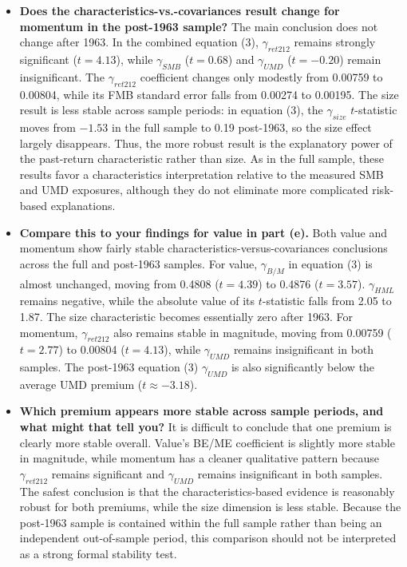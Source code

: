 \documentclass[11pt]{article}
\newenvironment{tight}
  {\begin{itemize}\setlength{\itemsep}{3pt}\setlength{\parskip}{0pt}%
   \setlength{\topsep}{3pt}\setlength{\leftmargini}{1.4em}}
  {\end{itemize}}
\begin{document}
\begin{tight}
  \item \textbf{Does the characteristics-vs.-covariances result change for momentum in the
  post-1963 sample?} The main conclusion does not change after 1963. In the combined
  equation (3), $\gamma_{ret212}$ remains strongly significant ($t = 4.13$), while
  $\gamma_{SMB}$ ($t = 0.68$) and $\gamma_{UMD}$ ($t = -0.20$) remain insignificant. The
  $\gamma_{ret212}$ coefficient changes only modestly from 0.00759 to 0.00804, while its
  FMB standard error falls from 0.00274 to 0.00195. The size result is less stable across
  sample periods: in equation (3), the $\gamma_{size}$ $t$-statistic moves from $-1.53$ in
  the full sample to 0.19 post-1963, so the size effect largely disappears. Thus, the more
  robust result is the explanatory power of the past-return characteristic rather than
  size. As in the full sample, these results favor a characteristics interpretation
  relative to the measured SMB and UMD exposures, although they do not eliminate more
  complicated risk-based explanations.
  \item \textbf{Compare this to your findings for value in part (e).} Both value and
  momentum show fairly stable characteristics-versus-covariances conclusions across the
  full and post-1963 samples. For value, $\gamma_{B/M}$ in equation (3) is almost
  unchanged, moving from 0.4808 ($t = 4.39$) to 0.4876 ($t = 3.57$). $\gamma_{HML}$
  remains negative, while the absolute value of its $t$-statistic falls from 2.05 to 1.87.
  The size characteristic becomes essentially zero after 1963. For momentum,
  $\gamma_{ret212}$ also remains stable in magnitude, moving from 0.00759 ($t = 2.77$) to
  0.00804 ($t = 4.13$), while $\gamma_{UMD}$ remains insignificant in both samples. The
  post-1963 equation (3) $\gamma_{UMD}$ is also significantly below the average UMD
  premium ($t \approx -3.18$).
  \item \textbf{Which premium appears more stable across sample periods, and what might
  that tell you?} It is difficult to conclude that one premium is clearly more stable
  overall. Value's BE/ME coefficient is slightly more stable in magnitude, while momentum
  has a cleaner qualitative pattern because $\gamma_{ret212}$ remains significant and
  $\gamma_{UMD}$ remains insignificant in both samples. The safest conclusion is that the
  characteristics-based evidence is reasonably robust for both premiums, while the size
  dimension is less stable. Because the post-1963 sample is contained within the full
  sample rather than being an independent out-of-sample period, this comparison should
  not be interpreted as a strong formal stability test.
\end{tight}
\end{document}
